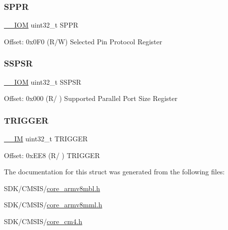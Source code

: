 \mbox{\label{struct_t_p_i___type_ae9673e1acb75a46ed9852fd7a557cb7d}} 
\subsubsection{\texorpdfstring{S\+P\+PR}{SPPR}}
{\footnotesize\ttfamily \mbox{\hyperlink{core__cm4_8h_ab6caba5853a60a17e8e04499b52bf691}{\+\_\+\+\_\+\+I\+OM}} uint32\+\_\+t S\+P\+PR}

Offset\+: 0x0\+F0 (R/W) Selected Pin Protocol Register \mbox{\label{struct_t_p_i___type_a1aa8bba158b6ac122676301f17a362d9}} 
\subsubsection{\texorpdfstring{S\+S\+P\+SR}{SSPSR}}
{\footnotesize\ttfamily \mbox{\hyperlink{core__cm4_8h_ab6caba5853a60a17e8e04499b52bf691}{\+\_\+\+\_\+\+I\+OM}} uint32\+\_\+t S\+S\+P\+SR}

Offset\+: 0x000 (R/ ) Supported Parallel Port Size Register \mbox{\label{struct_t_p_i___type_a5590387d8f44b477fd69951a737b0d7e}} 
\subsubsection{\texorpdfstring{T\+R\+I\+G\+G\+ER}{TRIGGER}}
{\footnotesize\ttfamily \mbox{\hyperlink{core__cm4_8h_a4cc1649793116d7c2d8afce7a4ffce43}{\+\_\+\+\_\+\+IM}} uint32\+\_\+t T\+R\+I\+G\+G\+ER}

Offset\+: 0x\+E\+E8 (R/ ) T\+R\+I\+G\+G\+ER 

The documentation for this struct was generated from the following files\+:\begin{DoxyCompactItemize}
\item 
S\+D\+K/\+C\+M\+S\+I\+S/\mbox{\hyperlink{core__armv8mbl_8h}{core\+\_\+armv8mbl.\+h}}\item 
S\+D\+K/\+C\+M\+S\+I\+S/\mbox{\hyperlink{core__armv8mml_8h}{core\+\_\+armv8mml.\+h}}\item 
S\+D\+K/\+C\+M\+S\+I\+S/\mbox{\hyperlink{core__cm4_8h}{core\+\_\+cm4.\+h}}\end{DoxyCompactItemize}
